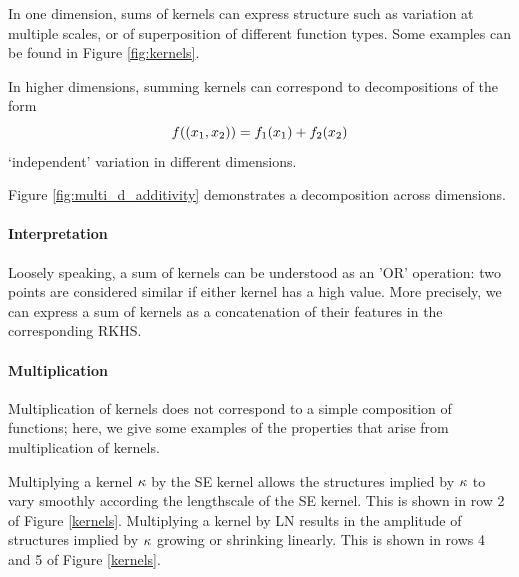 \documentclass[twoside]{article}
\begin{document}
In one dimension, sums of kernels can express structure such as variation at multiple scales, or of superposition of different function types.  Some examples can be found in Figure \ref{fig:kernels}.

In higher dimensions, summing kernels can correspond to decompositions of the form
\begin{equation}
f((x_1, x_2)) = f_1(x_1) + f_2(x_2)
\end{equation}
\ie `independent' variation in different dimensions.
%

%
Figure \ref{fig:multi_d_additivity} demonstrates a decomposition across dimensions.

\paragraph{Interpretation}
Loosely speaking, a sum of kernels can be understood as an 'OR' operation: two points are considered similar if either kernel has a high value.
More precisely, we can express a sum of kernels as a concatenation of their features in the corresponding RKHS.

\paragraph{Multiplication}

Multiplication of kernels does not correspond to a simple composition of functions; here, we give some examples of the properties that arise from multiplication of kernels.

%
%

Multiplying a kernel $\kappa$ by the SE kernel allows the structures implied by $\kappa$ to vary smoothly according the lengthscale of the SE kernel.  This is shown in row 2 of Figure \ref{kernels}.
Multiplying a kernel by LN results in the amplitude of structures implied by $\kappa$ growing or shrinking linearly. This is shown in rows 4 and 5 of Figure \ref{kernels}.
%
\end{document}
